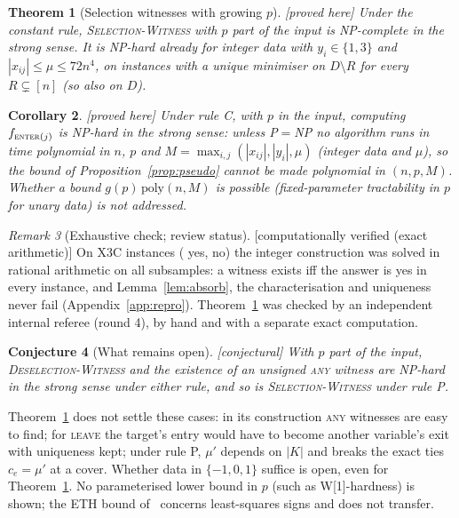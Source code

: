 \documentclass[10pt,a4paper]{article}
\theoremstyle{plain}
\newtheorem{theorem}{Theorem}[section]
\newtheorem{corollary}[theorem]{Corollary}
\newtheorem{conjecture}[theorem]{Conjecture}
\theoremstyle{definition}
\theoremstyle{remark}
\newtheorem{remark}[theorem]{Remark}
\newcommand{\status}[1]{\textnormal{\textsf{\small [#1]}}}
\newcommand{\Dm}{D\setminus R}
\newcommand{\tsc}[1]{\textnormal{\textsc{#1}}}  %
\begin{document}
\begin{theorem}[Selection witnesses with growing $p$]\label{thm:strong}\status{proved here}
Under the constant rule, \tsc{Selection-Witness} with $p$ part of the input is NP-complete in the strong sense. It is NP-hard already for integer data with $y_i\in\{1,3\}$ and $|x_{ij}|\le\mu\le72n^4$, on instances with a unique minimiser on $\Dm$ for every $R\subsetneq[n]$ (so also on $D$).
\end{theorem}
\begin{corollary}\label{cor:strong-f}\status{proved here}
Under rule C, with $p$ in the input, computing $f_{\tsc{enter}(j)}$ is NP-hard in the strong sense: unless P${}={}$NP no algorithm runs in time polynomial in $n$, $p$ and $M=\max_{i,j}(|x_{ij}|,|y_i|,\mu)$ (integer data and $\mu$), so the bound of Proposition~\ref{prop:pseudo} cannot be made polynomial in $(n,p,M)$. Whether a bound $g(p)\,\mathrm{poly}(n,M)$ is possible (fixed-parameter tractability in $p$ for unary data) is not addressed.
\end{corollary}

\begin{remark}[Exhaustive check; review status]\label{rem:verify-strong}\status{computationally verified (exact arithmetic)}
On \StrongInst{} \tsc{X3C} instances (\StrongYes{} yes, \StrongNo{} no) the integer construction was solved in rational arithmetic on all \StrongSubsets{} subsamples: a witness exists iff the answer is yes in every instance, and Lemma~\ref{lem:absorb}, the characterisation and uniqueness never fail (Appendix~\ref{app:repro}). Theorem~\ref{thm:strong} was checked by an independent internal referee (round 4), by hand and with a separate exact computation.
\end{remark}

\begin{conjecture}[What remains open]\label{conj:strong-rest}\status{conjectural}
With $p$ part of the input, \tsc{Deselection-Witness} and the existence of an unsigned \tsc{any} witness are NP-hard in the strong sense under either rule, and so is \tsc{Selection-Witness} under rule P.
\end{conjecture}
\noindent Theorem~\ref{thm:strong} does not settle these cases: in its construction \tsc{any} witnesses are easy to find; for \tsc{leave} the target's entry would have to become another variable's exit with uniqueness kept; under rule P, $\mu'$ depends on $|K|$ and breaks the exact ties $c_e=\mu'$ at a cover. Whether data in $\{-1,0,1\}$ suffice is open, even for Theorem~\ref{thm:strong}. No parameterised lower bound in $p$ (such as W[1]-hardness) is shown; the ETH bound of~\citet{moitra2022} concerns least-squares signs and does not transfer.
\end{document}
